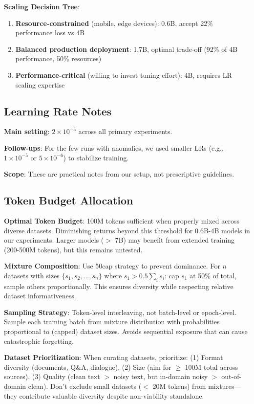 \textbf{Scaling Decision Tree}:
\begin{enumerate}
\item \textbf{Resource-constrained} (mobile, edge devices): 0.6B, accept 22\% performance loss vs 4B
\item \textbf{Balanced production deployment}: 1.7B, optimal trade-off (92\% of 4B performance, 50\% resources)
\item \textbf{Performance-critical} (willing to invest tuning effort): 4B, requires LR scaling expertise
\end{enumerate}

\subsection{Learning Rate Notes}

\textbf{Main setting}: $2 \times 10^{-5}$ across all primary experiments.

\textbf{Follow-ups}: For the few runs with anomalies, we used smaller LRs (e.g., $1\times10^{-5}$ or $5\times10^{-6}$) to stabilize training.

\textbf{Scope}: These are practical notes from our setup, not prescriptive guidelines.

\subsection{Token Budget Allocation}

\textbf{Optimal Token Budget}: 100M tokens sufficient when properly mixed across diverse datasets. Diminishing returns beyond this threshold for 0.6B-4B models in our experiments. Larger models ($>$ 7B) may benefit from extended training (200-500M tokens), but this remains untested.

\textbf{Mixture Composition}: Use 50cap strategy to prevent dominance. For $n$ datasets with sizes $\{s_1, s_2, ..., s_n\}$ where $s_1 > 0.5 \sum_i s_i$: cap $s_1$ at 50\% of total, sample others proportionally. This ensures diversity while respecting relative dataset informativeness.

\textbf{Sampling Strategy}: Token-level interleaving, not batch-level or epoch-level. Sample each training batch from mixture distribution with probabilities proportional to (capped) dataset sizes. Avoids sequential exposure that can cause catastrophic forgetting.

\textbf{Dataset Prioritization}: When curating datasets, prioritize: (1) Format diversity (documents, Q\&A, dialogue), (2) Size (aim for $\geq$ 100M total across sources), (3) Quality (clean text $>$ noisy text, but in-domain noisy $>$ out-of-domain clean). Don't exclude small datasets ($<$ 20M tokens) from mixtures—they contribute valuable diversity despite non-viability standalone.

